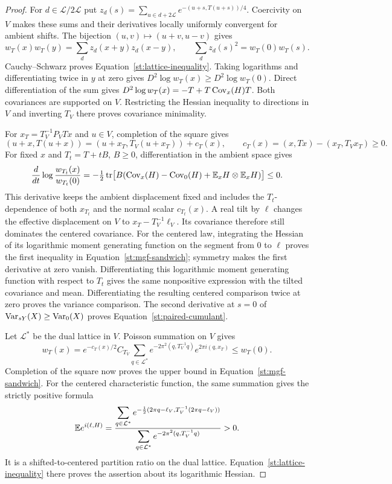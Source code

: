 \begin{proof}
For $d\in\mathcal L/2\mathcal L$ put
$z_d(s)=\sum_{u\in d+2\mathcal L}e^{-(u+s,T(u+s))/4}$.
Coercivity on $V$ makes these sums and their derivatives locally uniformly
convergent for ambient shifts.
The bijection $(u,v)\mapsto(u+v,u-v)$ gives
\[
 w_T(x)w_T(y)=\sum_d z_d(x+y)z_d(x-y),\qquad
 \sum_d z_d(s)^2=w_T(0)w_T(s).
\]
Cauchy--Schwarz proves Equation~\eqref{st:lattice-inequality}.
Taking logarithms and differentiating twice in $y$ at zero gives
$D^2\log w_T(x)\ge D^2\log w_T(0)$. Direct differentiation of the sum gives
$D^2\log w_T(x)=-T+T\operatorname{Cov}_x(H)T$. Both covariances are supported on $V$.
Restricting the Hessian inequality to directions in $V$ and inverting $T_V$
there proves covariance minimality.

For $x_T=T_V^{-1}P_VTx$ and $u\in V$, completion of the square gives
\[
 (u+x,T(u+x))=(u+x_T,T_V(u+x_T))+c_T(x),\qquad
 c_T(x)=(x,Tx)-(x_T,T_Vx_T)\ge0.
\]
For fixed $x$ and $T_t=T+tB$, $B\ge0$, differentiation in the ambient
space gives
\[
 \frac{d}{dt}\log\frac{w_{T_t}(x)}{w_{T_t}(0)}
 =-\tfrac12\operatorname{tr}\bigl[B(\operatorname{Cov}_x(H)-\operatorname{Cov}_0(H)
                         +\mathbb E_xH\otimes\mathbb E_xH)\bigr]\le0.
\]
This derivative keeps the ambient displacement fixed and includes the
$T_t$-dependence of both $x_{T_t}$ and the normal scalar $c_{T_t}(x)$.
A real tilt by $\ell$ changes the effective displacement on $V$ to
$x_T-T_V^{-1}\ell_V$. Its covariance therefore still dominates the centered
covariance. For the centered law, integrating the Hessian of its logarithmic
moment generating function on the segment from $0$ to $\ell$ proves the
first inequality in Equation~\eqref{st:mgf-sandwich}; symmetry makes the
first derivative at zero vanish. Differentiating this logarithmic moment
generating function with respect to $T_t$ gives the same nonpositive
expression with the tilted covariance and mean. Differentiating the resulting
centered comparison twice at zero proves the variance comparison. The second
derivative at $s=0$ of $\operatorname{Var}_{sY}(X)\ge\operatorname{Var}_0(X)$ proves
Equation~\eqref{st:paired-cumulant}.

Let $\mathcal L^*$ be the dual lattice in $V$. Poisson summation on $V$ gives
\[
 w_T(x)=e^{-c_T(x)/2}C_{T_V}\sum_{q\in\mathcal L^*}
 e^{-2\pi^2(q,T_V^{-1}q)}e^{2\pi i(q,x_T)}\le w_T(0).
\]
Completion of the square now proves the upper bound in
Equation~\eqref{st:mgf-sandwich}. For the centered characteristic function,
the same summation gives the strictly positive formula
\[
 \mathbb E e^{i(\ell,H)}
 =\frac{\displaystyle\sum_{q\in\mathcal L^*}
 e^{-\frac12(2\pi q-\ell_V,T_V^{-1}(2\pi q-\ell_V))}}
 {\displaystyle\sum_{q\in\mathcal L^*}e^{-2\pi^2(q,T_V^{-1}q)}}>0.
\]
It is a shifted-to-centered partition ratio on the dual lattice.
Equation~\eqref{st:lattice-inequality} there proves the assertion about its
logarithmic Hessian.


\end{proof}
